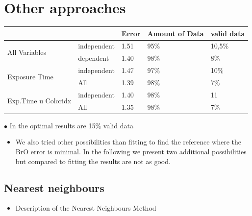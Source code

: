 \documentclass  [
  paper    = a4,
  BCOR     = 10mm,
  twoside,
  fontsize = 12pt,
  fleqn,
  toc      = bibnumbered,
  toc      = listofnumbered,
  numbers  = noendperiod,
  headings = normal,
  listof   = leveldown,
  version  = 3.03
]                                       {scrreprt}
\begin{document}
	\section{Other approaches}
		\begin{table}[h]
		\begin{tabular}{|p{2cm}|p{2.5cm}|p{1.5cm}|p{1.5cm}||p{1cm}|}
			&& Error & Amount of Data&valid data\\
			\toprule
			\multirow{2}{5em}{All Variables} 
			& independent& 1.51 & 95$\%$&10,5$\%$\\
			& dependent & 1.40&98$\%$ &8$\%$\\
			\midrule
			\multirow{2}{5em}{Exposure Time}
			&  independent &1.47&97$\%$&10$\%$\\
			& All &1.39&98$\%$&7$\%$\\
			\midrule
			\multirow{2}{5em}{Exp.Time u Coloridx}
			&  independent &1.40& 98$\%$&11\\
			& All & 1.35& 98$\%$&7$\%$\\
			\bottomrule
		\end{tabular}
	\end{table}
	$\bullet$ In the optimal results are 15$\%$ valid data
	\begin{itemize}
		\item We also tried other possibilities than fitting to find the reference where the BrO error is minimal. In the following we present two additional possibilities but compared to fitting the results are not as good.
	\end{itemize}
	\subsection{Nearest neighbours}
	\begin{itemize}
		\item Description of the Nearest Neighbours Method
	\end{itemize}
\end{document}
